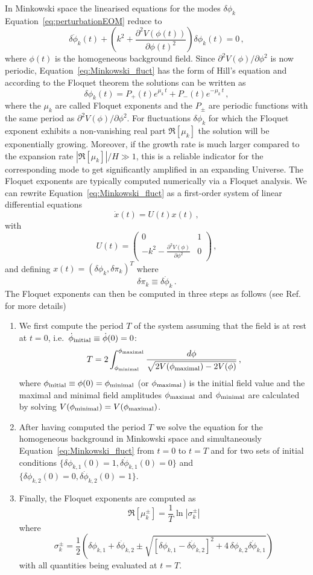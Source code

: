 \documentclass[12pt]{article}
\newcommand{\be}{\begin{equation}}
\newcommand{\ee}{\end{equation}}
\begin{document}
In Minkowski space the linearised equations for the modes $\delta\phi_k$ Equation~\eqref{eq:perturbationEOM} reduce to
\be
\delta\ddot{\phi}_k(t) + \left(k^2 + \frac{\partial^2V(\phi(t))}{\partial \phi(t)^2}\right)\delta\phi_k(t) = 0\,,
\label{eq:Minkowski_fluct}
\ee
where $\phi(t)$ is the homogeneous background field. Since $\partial^2V(\phi)/\partial \phi^2$ is now periodic, Equation~\eqref{eq:Minkowski_fluct} has the form of Hill's equation and according to the Floquet theorem the solutions can be written as
\be
\delta\phi_k(t) = P_+(t)e^{\mu_k\,t} + P_-(t)e^{-\mu_k\,t}\,,
\ee
where the $\mu_k$ are called Floquet exponents and the $P_{\pm}$ are periodic functions with the same period as $\partial^2V(\phi)/\partial \phi^2$. For fluctuations $\delta\phi_k$ for which the Floquet exponent exhibits a non-vanishing real part $\Re[\mu_k]$ the solution will be exponentially growing. Moreover, if the growth rate is much larger compared to the expansion rate $|\Re[\mu_k]|/H \gg 1$, this is a reliable indicator for the corresponding mode to get significantly amplified in an expanding Universe. The Floquet exponents are typically computed numerically via a Floquet analysis. We can rewrite Equation~\eqref{eq:Minkowski_fluct} as a first-order system of linear differential equations 
\be
\dot{x}(t)=U(t)x(t)\,,
\ee
with
\be
U(t) = \begin{pmatrix}0 & 1\\ -k^2-\frac{\partial^2V(\phi)}{\partial \phi^2} & 0 \end{pmatrix}\,,
\ee
and defining $x(t)=(\delta\phi_k , \delta\pi_k)^T$ where
\be
\delta\pi_k \equiv \delta\dot{\phi}_k\,.
\ee
The Floquet exponents can then be computed in three steps as follows (see Ref.\cite{Amin:2014eta} for more details)
\begin{enumerate}
\item We first compute the period $T$ of the system assuming that the field is at rest at $t=0$, i.e.\ $\dot{\phi}_{\rm initial}\equiv\dot{\phi}(0)=0$:
\be
T = 2\int_{\phi_{\rm minimal}}^{\phi_{\rm maximal}} \frac{d\phi}{\sqrt{2V(\phi_{\rm maximal}) - 2V(\phi)}}\,,
\ee
where $\phi_{\rm initial}\equiv\phi(0)=\phi_{\rm minimal}$ (or $\phi_{\rm maximal}$) is the initial field value and the maximal and minimal field amplitudes $\phi_{\rm maximal}$ and $\phi_{\rm minimal}$ are calculated by solving $V(\phi_{\rm minimal}) = V(\phi_{\rm maximal})$. 
\item After having computed the period $T$ we solve the equation for the homogeneous background in Minkowski space and simultaneously Equation~\eqref{eq:Minkowski_fluct} from $t=0$ to $t=T$ and for two sets of initial conditions $\{\delta\phi_{k,1}(0) = 1,\delta\dot{\phi}_{k,1}(0) = 0\}$ and $\{\delta\phi_{k,2}(0) = 0,\delta\dot{\phi}_{k,2}(0) = 1\}$.
\item Finally, the Floquet exponents are computed as
\be
\Re[\mu^{\pm}_k] = \frac{1}{T}\ln |\sigma^{\pm}_{k}|
\ee
where
\be
\sigma^{\pm}_{k} = \frac{1}{2}\left(\delta\phi_{k,1} + \delta\dot{\phi}_{k,2} \pm \sqrt{\left[\delta\phi_{k,1} - \delta\dot{\phi}_{k,2}\right]^2 + 4\,\delta\phi_{k,2}\delta\dot{\phi}_{k,1}}\right)
\ee
with all quantities being evaluated at $t=T$.
\end{enumerate}
\end{document}
